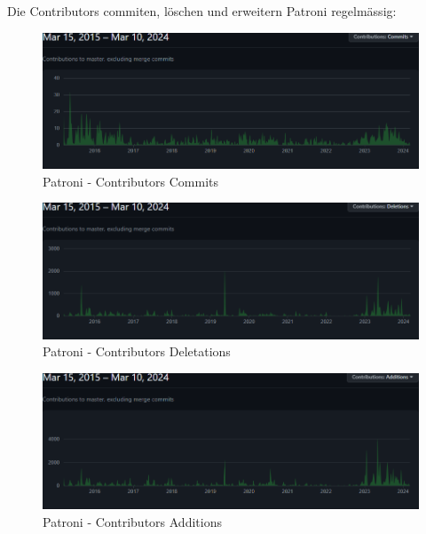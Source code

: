 \begin{flushleft}
    Die Contributors commiten, löschen und erweitern Patroni regelmässig:
    \begin{figure}[H]
        \centering
        \includegraphics[width=0.75\linewidth]{source/implementation/evaluation/postgresql_ha_solutions/insights/patroni/contributors_commits_zalando_patroni}
        \caption{Patroni - Contributors Commits}
        \label{fig:contributors_commits_zalando_patroni}
    \end{figure}
    \begin{figure}[H]
        \centering
        \includegraphics[width=0.75\linewidth]{source/implementation/evaluation/postgresql_ha_solutions/insights/patroni/contributors_deletations_zalando_patroni}
        \caption{Patroni - Contributors Deletations}
        \label{fig:contributors_deletations_zalando_patroni}
    \end{figure}
    \begin{figure}[H]
        \centering
        \includegraphics[width=0.75\linewidth]{source/implementation/evaluation/postgresql_ha_solutions/insights/patroni/contributors_additions_zalando_patroni}
        \caption{Patroni - Contributors Additions}
        \label{fig:contributors_additions_zalando_patroni}
    \end{figure}


\end{flushleft}
